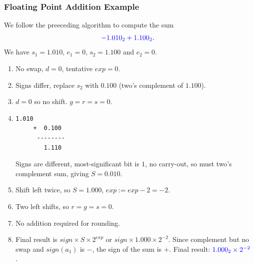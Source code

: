 \documentclass{beamer}
\begin{document}
\begin{frame}[fragile]
\frametitle{Floating Point Addition Example}

\scriptsize

We follow the preeceding algorithm to compute the sum
$$
\textcolor{blue}{-1.010_2 + 1.100_2}.
$$
We have $s_1 = 1.010$, $e_1 = 0$, $s_2 = 1.100$ and $e_2 = 0$.\\

\begin{enumerate}

\item No swap, $d = 0$, tentative $exp = 0$.\\

\item Signs differ, replace $s_2$ with $0.100$ (two's complement of $1.100$).\\

\item $d = 0$ so no shift. $g = r = s = 0$.\\

\item
  \begin{center}
    \begin{Verbatim}[commandchars=@\[\]]
        1.010
     +  0.100
      --------
        1.110
    \end{Verbatim}
  \end{center} Signs are different, most-significant bit is $1$, no carry-out, so must two's complement sum, giving $S = 0.010$.\\

\item Shift left twice, so $S = 1.000$, $exp := exp - 2 = -2$.\\

\item Two left shifts, so $r = g = s = 0$.\\

\item No addition required for rounding.\\

\item Final result is $sign \times S\times 2^{exp}$ or $sign \times 1.000 \times 2^{-2}$.
  Since complement but no swap and $sign(a_1)$ is $-$, the sign of the sum is $+$.
  Final result: $\textcolor{blue}{1.000_2\times 2^{-2}}$.

\end{enumerate}

\end{frame}
\end{document}
